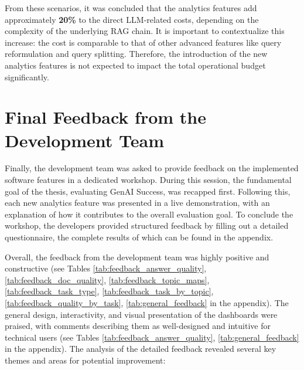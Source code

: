 \documentclass[
	english,
	ruledheaders=section,%
	class=report,%
	thesis={type=bachelor},%
	accentcolor=1b,%
	custommargins=true,%
	marginpar=false,%
	parskip=half-,%
	fontsize=11pt,%
	DIV=14,
]{tudapub}
\begin{document}
From these scenarios, it was concluded that the analytics features add approximately \textbf{20\%} to the direct LLM-related costs, depending on the complexity of the underlying RAG chain. It is important to contextualize this increase: the cost is comparable to that of other advanced features like query reformulation and query splitting. Therefore, the introduction of the new analytics features is not expected to impact the total operational budget significantly.

\section{Final Feedback from the Development Team}
Finally, the development team was asked to provide feedback on the implemented software features in a dedicated workshop. During this session, the fundamental goal of the thesis, evaluating GenAI Success, was recapped first. Following this, each new analytics feature was presented in a live demonstration, with an explanation of how it contributes to the overall evaluation goal. To conclude the workshop, the developers provided structured feedback by filling out a detailed questionnaire, the complete results of which can be found in the appendix.

Overall, the feedback from the development team was highly positive and constructive (see Tables \ref{tab:feedback_answer_quality}, \ref{tab:feedback_doc_quality}, \ref{tab:feedback_topic_maps}, \ref{tab:feedback_task_type}, \ref{tab:feedback_task_by_topic}, \ref{tab:feedback_quality_by_task}, \ref{tab:general_feedback} in the appendix). The general design, interactivity, and visual presentation of the dashboards were praised, with comments describing them as well-designed and intuitive for technical users (see Tables \ref{tab:feedback_answer_quality}, \ref{tab:general_feedback} in the appendix). The analysis of the detailed feedback revealed several key themes and areas for potential improvement:
\end{document}
